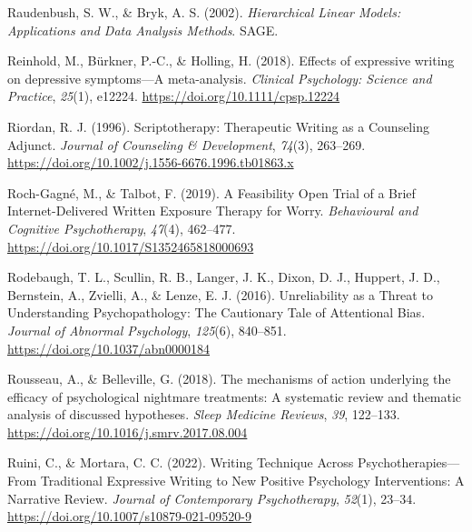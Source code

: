 \documentclass[
  man,floatsintext]{apa7}
\newlength{\cslhangindent}
\newlength{\cslentryspacingunit} %
\newenvironment{CSLReferences}[2] %
 {%
  \setlength{\parindent}{0pt}
  \ifodd #1
  \let\oldpar\par
  \def\par{\hangindent=\cslhangindent\oldpar}
  \fi
  \setlength{\parskip}{#2\cslentryspacingunit}
 }%
 {}
\begin{document}
\begin{CSLReferences}{1}{0}
\leavevmode{}%
Raudenbush, S. W., \& Bryk, A. S. (2002). \emph{Hierarchical Linear Models: Applications and Data Analysis Methods}. SAGE.

\leavevmode{}%
Reinhold, M., Bürkner, P.-C., \& Holling, H. (2018). Effects of expressive writing on depressive symptoms---A meta-analysis. \emph{Clinical Psychology: Science and Practice}, \emph{25}(1), e12224. \url{https://doi.org/10.1111/cpsp.12224}

\leavevmode{}%
Riordan, R. J. (1996). Scriptotherapy: Therapeutic Writing as a Counseling Adjunct. \emph{Journal of Counseling \& Development}, \emph{74}(3), 263--269. \url{https://doi.org/10.1002/j.1556-6676.1996.tb01863.x}

\leavevmode{}%
Roch-Gagné, M., \& Talbot, F. (2019). A Feasibility Open Trial of a Brief Internet-Delivered Written Exposure Therapy for Worry. \emph{Behavioural and Cognitive Psychotherapy}, \emph{47}(4), 462--477. \url{https://doi.org/10.1017/S1352465818000693}

\leavevmode{}%
Rodebaugh, T. L., Scullin, R. B., Langer, J. K., Dixon, D. J., Huppert, J. D., Bernstein, A., Zvielli, A., \& Lenze, E. J. (2016). Unreliability as a Threat to Understanding Psychopathology: The Cautionary Tale of Attentional Bias. \emph{Journal of Abnormal Psychology}, \emph{125}(6), 840--851. \url{https://doi.org/10.1037/abn0000184}

\leavevmode{}%
Rousseau, A., \& Belleville, G. (2018). The mechanisms of action underlying the efficacy of psychological nightmare treatments: A systematic review and thematic analysis of discussed hypotheses. \emph{Sleep Medicine Reviews}, \emph{39}, 122--133. \url{https://doi.org/10.1016/j.smrv.2017.08.004}

\leavevmode{}%
Ruini, C., \& Mortara, C. C. (2022). Writing Technique Across Psychotherapies---From Traditional Expressive Writing to New Positive Psychology Interventions: A Narrative Review. \emph{Journal of Contemporary Psychotherapy}, \emph{52}(1), 23--34. \url{https://doi.org/10.1007/s10879-021-09520-9}


\end{CSLReferences}
\end{document}
